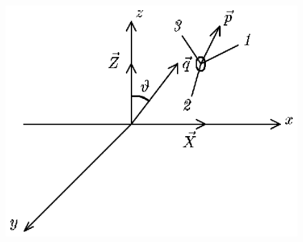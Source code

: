 \begin{figure}[tbp]
\centerline{\hbox{\includegraphics[scale=0.9]{Ris/ris_eps/ris4_1_07.eps}}}

\end{figure}


